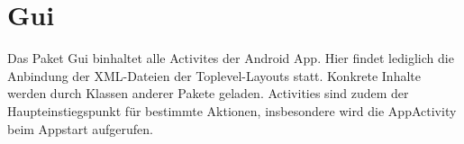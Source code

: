 \section{Gui}
Das Paket Gui binhaltet alle Activites der Android App. Hier findet lediglich die Anbindung der XML-Dateien der Toplevel-Layouts statt. Konkrete Inhalte werden durch Klassen anderer Pakete geladen. Activities sind zudem der Haupteinstiegspunkt für bestimmte Aktionen, insbesondere wird die AppActivity beim Appstart aufgerufen.
